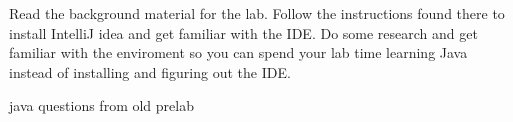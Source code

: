 \documentclass[../../main.tex]{subfiles}
\begin{document}
\begin{steps}
   \item Read the background material for the lab. Follow the instructions found there to install IntelliJ
      idea and get familiar with the IDE. Do some research and get familiar with the enviroment so you can
      spend your lab time learning Java instead of installing and figuring out the IDE.
   \item java questions from old prelab
\end{steps}
\end{document}
